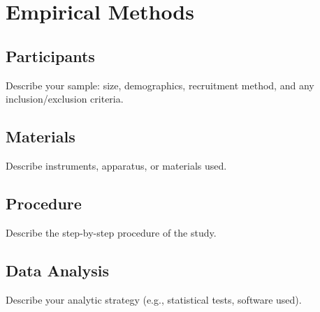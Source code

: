 \section{Empirical Methods}

\subsection{Participants}

Describe your sample: size, demographics, recruitment method, and
any inclusion/exclusion criteria.

\subsection{Materials}

Describe instruments, apparatus, or materials used.

\subsection{Procedure}

Describe the step-by-step procedure of the study.

\subsection{Data Analysis}

Describe your analytic strategy (e.g., statistical tests, software
used).
